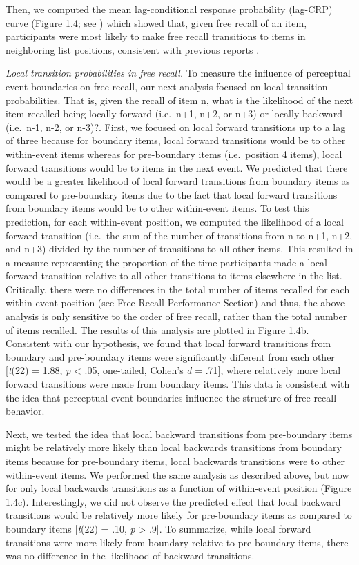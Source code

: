 Then, we computed the mean lag-conditional response probability
(lag-CRP) curve (Figure 1.4; see \autocite{kahana_associative_1996})
which showed that, given free recall of an item, participants were most
likely to make free recall transitions to items in neighboring list
positions, consistent with previous reports
\autocites{howard_distributed_2002}{kahana_associative_1996}.

\emph{Local transition probabilities in free recall.} To measure the
influence of perceptual event boundaries on free recall, our next
analysis focused on local transition probabilities. That is, given the
recall of item n, what is the likelihood of the next item recalled being
locally forward (i.e.~n+1, n+2, or n+3) or locally backward (i.e.~n-1,
n-2, or n-3)?. First, we focused on local forward transitions up to a
lag of three because for boundary items, local forward transitions would
be to other within-event items whereas for pre-boundary items
(i.e.~position 4 items), local forward transitions would be to items in
the next event. We predicted that there would be a greater likelihood of
local forward transitions from boundary items as compared to
pre-boundary items due to the fact that local forward transitions from
boundary items would be to other within-event items. To test this
prediction, for each within-event position, we computed the likelihood
of a local forward transition (i.e.~the sum of the number of transitions
from n to n+1, n+2, and n+3) divided by the number of transitions to all
other items. This resulted in a measure representing the proportion of
the time participants made a local forward transition relative to all
other transitions to items elsewhere in the list. Critically, there were
no differences in the total number of items recalled for each
within-event position (see Free Recall Performance Section) and thus,
the above analysis is only sensitive to the order of free recall, rather
than the total number of items recalled. The results of this analysis
are plotted in Figure 1.4b. Consistent with our hypothesis, we found
that local forward transitions from boundary and pre-boundary items were
significantly different from each other {[}\emph{t}(22) = 1.88, \emph{p}
\textless{} .05, one-tailed, Cohen's \emph{d} = .71{]}, where relatively
more local forward transitions were made from boundary items. This data
is consistent with the idea that perceptual event boundaries influence
the structure of free recall behavior.

Next, we tested the idea that local backward transitions from
pre-boundary items might be relatively more likely than local backwards
transitions from boundary items because for pre-boundary items, local
backwards transitions were to other within-event items. We performed the
same analysis as described above, but now for only local backwards
transitions as a function of within-event position (Figure 1.4c).
Interestingly, we did not observe the predicted effect that local
backward transitions would be relatively more likely for pre-boundary
items as compared to boundary items {[}\emph{t}(22) = .10, \emph{p}
\textgreater{} .9{]}. To summarize, while local forward transitions were
more likely from boundary relative to pre-boundary items, there was no
difference in the likelihood of backward transitions.

